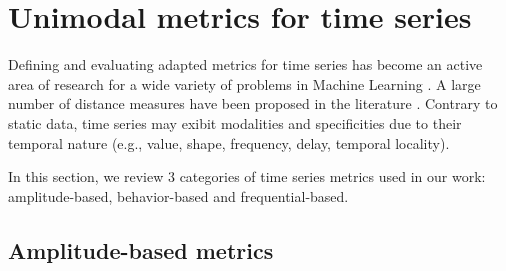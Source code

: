 \section{Unimodal metrics for time series}

Defining and evaluating adapted metrics for time series has become an active area of research for a wide variety of problems in Machine Learning \cite{Ding2008, Najmeddine2012}. A large number of distance measures have been proposed in the literature \cite{Montero2014}. Contrary to static data, time series may exibit modalities and specificities due to their temporal nature (e.g., value, shape, frequency, delay, temporal locality).

In this section, we review 3 categories of time series metrics used in our work: amplitude-based, behavior-based and frequential-based.



%




\subsection{Amplitude-based metrics}
\label{sec:TSmetrics}

